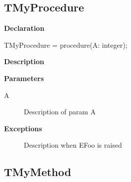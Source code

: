 \documentclass{report}
\newif\ifpdf
\begin{document}
\subsection*{TMyProcedure}
\fi
\label{ok_param_raises_returns_proctype-TMyProcedure}
\begin{list}{}{
\setlength{\itemindent}{0cm}
\setlength{\listparindent}{0cm}
\setlength{\leftmargin}{\evensidemargin}
\addtolength{\leftmargin}{\tmplength}
\settowidth{\labelsep}{X}
\addtolength{\leftmargin}{\labelsep}
\setlength{\labelwidth}{\tmplength}
}
\item[\textbf{Declaration}\hfill]
\ifpdf
\begin{flushleft}
\fi
\begin{ttfamily}
TMyProcedure = procedure(A: integer);\end{ttfamily}

\ifpdf
\end{flushleft}
\fi

\par
\item[\textbf{Description}]
 \par
\item[\textbf{Parameters}]
\begin{description}
\item[A] Description of param A
\end{description}
\item[\textbf{Exceptions}]
\begin{description}
\item[\begin{ttfamily}EFoo\end{ttfamily}(\ref{ok_param_raises_returns_proctype.EFoo})] Description when EFoo is raised
\end{description}


\end{list}
\ifpdf
\subsection*{\large{\textbf{TMyMethod}}\normalsize\hspace{1ex}\hrulefill}
\else
\end{document}
